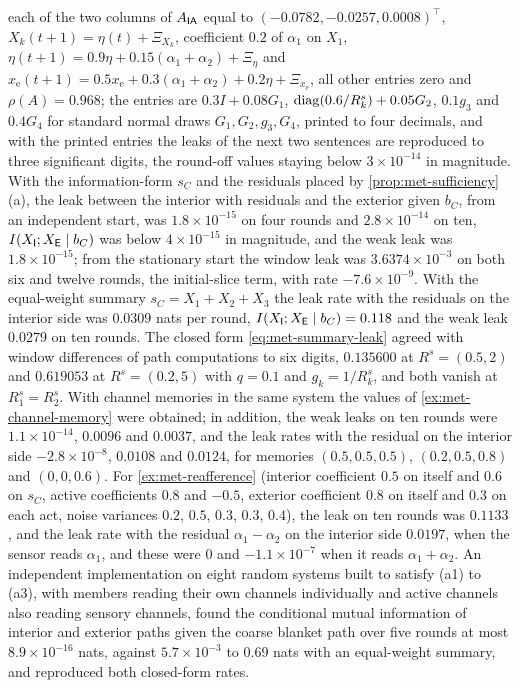\begin{numcheck}
each of the two columns of $A_{\mathsf{I}\mathsf{A}}$ equal to $(-0.0782,-0.0257,0.0008)^\top$, $X_k(t+1)=\eta(t)+\Xi_{X_k}$, coefficient $0.2$ of $\alpha_1$ on $X_1$, $\eta(t+1)=0.9\eta+0.15(\alpha_1+\alpha_2)+\Xi_\eta$ and $x_{\mathrm e}(t+1)=0.5x_{\mathrm e}+0.3(\alpha_1+\alpha_2)+0.2\eta+\Xi_{x_{\mathrm e}}$, all other entries zero and $\rho(A)=0.968$; the entries are $0.3I+0.08G_1$, $\operatorname{diag}(0.6/R^s_k)+0.05G_2$, $0.1g_3$ and $0.4G_4$ for standard normal draws $G_1,G_2,g_3,G_4$, printed to four decimals, and with the printed entries the leaks of the next two sentences are reproduced to three significant digits, the round-off values staying below $3\times10^{-14}$ in magnitude. With the information-form $s_C$ and the residuals placed by \cref{prop:met-sufficiency}(a), the leak between the interior with residuals and the exterior given $b_C$, from an independent start, was $1.8\times10^{-15}$ on four rounds and $2.8\times10^{-14}$ on ten, $I(X_{\mathsf{I}};X_{\mathsf{E}}\mid b_C)$ was below $4\times10^{-15}$ in magnitude, and the weak leak was $1.8\times10^{-15}$; from the stationary start the window leak was $3.6374\times10^{-3}$ on both six and twelve rounds, the initial-slice term, with rate $-7.6\times10^{-9}$. With the equal-weight summary $s_C=X_1+X_2+X_3$ the leak rate with the residuals on the interior side was $0.0309$ nats per round, $I(X_{\mathsf{I}};X_{\mathsf{E}}\mid b_C)=0.118$ and the weak leak $0.0279$ on ten rounds. The closed form \eqref{eq:met-summary-leak} agreed with window differences of path computations to six digits, $0.135600$ at $R^s=(0.5,2)$ and $0.619053$ at $R^s=(0.2,5)$ with $q=0.1$ and $g_k=1/R^s_k$, and both vanish at $R^s_1=R^s_2$. With channel memories in the same system the values of \cref{ex:met-channel-memory} were obtained; in addition, the weak leaks on ten rounds were $1.1\times10^{-14}$, $0.0096$ and $0.0037$, and the leak rates with the residual on the interior side $-2.8\times10^{-8}$, $0.0108$ and $0.0124$, for memories $(0.5,0.5,0.5)$, $(0.2,0.5,0.8)$ and $(0,0,0.6)$. For \cref{ex:met-reafference} (interior coefficient $0.5$ on itself and $0.6$ on $s_C$, active coefficients $0.8$ and $-0.5$, exterior coefficient $0.8$ on itself and $0.3$ on each act, noise variances $0.2$, $0.5$, $0.3$, $0.3$, $0.4$), the leak on ten rounds was $0.1133$, and the leak rate with the residual $\alpha_1-\alpha_2$ on the interior side $0.0197$, when the sensor reads $\alpha_1$, and these were $0$ and $-1.1\times10^{-7}$ when it reads $\alpha_1+\alpha_2$. An independent implementation on eight random systems built to satisfy (a1) to (a3), with members reading their own channels individually and active channels also reading sensory channels, found the conditional mutual information of interior and exterior paths given the coarse blanket path over five rounds at most $8.9\times10^{-16}$ nats, against $5.7\times10^{-3}$ to $0.69$ nats with an equal-weight summary, and reproduced both closed-form rates.
\end{numcheck}

